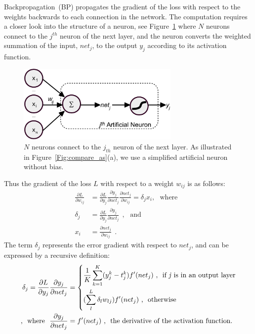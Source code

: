 Backpropagation~(BP) propagates the gradient of the loss with respect to the weights backwards to each connection in the network.
The computation requires a closer look into the structure of a neuron, see Figure~\ref{Fig:neuron_net} where $N$ neurons connect to the $j^{th}$ neuron of the next layer, and the neuron converts the weighted summation of the input, $net_j$, to the output $y_j$ according to its activation function.
\begin{figure}[bt]
	\centering
	\includegraphics[width=0.7\textwidth]{pics_iconip/neuron.pdf}
	\caption{ $N$ neurons connect to the $j_{th}$ neuron of the next layer. As illustrated in Figure~\ref{Fig:compare_as}(a), we use a simplified artificial neuron without bias.}
	\label{Fig:neuron_net}
\end{figure}
Thus the gradient of the loss $L$ with respect to a weight $w_{ij}$ is as follows:
\begin{equation}
\begin{aligned}
\frac{\partial L}{\partial w_{ij}} &= \frac{\partial L}{\partial y_j} \frac{\partial y_j}{\partial net_j} \frac{\partial net_j}{\partial w_{ij}} = \delta_j x_i , \textrm{~~where~~}\\
 \delta_j &=  \frac{\partial L}{\partial y_j} \frac{\partial y_j}{\partial net_j}~~,  \textrm{~~and~~}\\
x_i &= \frac{\partial net_j}{\partial w_{ij}}~~.
\end{aligned}
\end{equation}
The term $ \delta_j $ represents the error gradient with respect to $net_j$, and can be expressed by a recursive definition:
\begin{equation}
\begin{aligned}
\delta_j =  \frac{\partial L}{\partial y_j} \frac{\partial y_j}{\partial net_j} &= \left\{
\begin{aligned}
&\frac{1}{K}\sum_{k=1}^K (y^{k}_{j}-t^{k}_{j}) f'(net_j)  \textrm{~,~~if \textit{j} is in an output layer} \\
&(\sum_l^L \delta_l w_{lj}) f'(net_j)  \textrm{~,~~otherwise}
\end{aligned}
\right. \\
\textrm{,~~where~~} \frac{\partial y_j}{\partial net_j} &=  f'(net_j) \textrm{~,~~the derivative of the activation function}.
\end{aligned}
\label{equ:derivative}
\end{equation}
